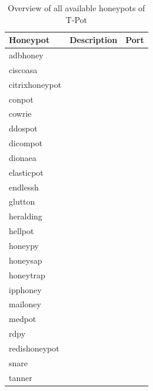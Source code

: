 \begin{table}[h]
    \centering
    \caption{Overview of all available honeypots of T-Pot}
    \begin{tabularx}{\linewidth}{l|l|l}
        \toprule
        \textbf{Honeypot}                                 & \textbf{Description} & \textbf{Port} \\
        \hline
        adbhoney                                 &             &      \\
        ciscoasa \cite{cymmetria2018}            &             &      \\
        citrixhoneypot \cite{citrixhoneypot2020} &             &      \\
        conpot \cite{conpot2021}                 &             &      \\
        cowrie \cite{cowire2021}                 &             &      \\
        ddospot \cite{ddosspot2021}              &             &      \\
        dicompot \cite{dicompot2021}             &             &      \\
        dionaea \cite{dionaea2021}               &             &      \\
        elasticpot \cite{elasticpot2021}         &             &      \\
        endlessh \cite{endlessh2021}             &             &      \\
        glutton \cite{glutton2021}               &             &      \\
        heralding \cite{heralding2021}           &             &      \\
        hellpot \cite{hellpot2021}               &             &      \\
        honeypy \cite{honeysap2021}              &             &      \\
        honeysap \cite{honeysap2021}             &             &      \\
        honeytrap \cite{honeytrap2021}           &             &      \\
        ipphoney \cite{ipphoney2021}             &             &      \\
        mailoney                                 &             &      \\
        medpot \cite{medpot2021}                 &             &      \\
        rdpy \cite{rdpy2021}                     &             &      \\
        redishoneypot                            &             &      \\
        snare \cite{snare2021}                   &             &      \\
        tanner \cite{tanner2021}                 &             &      \\
        \bottomrule
    \end{tabularx}
    \label{tab:overview-honeypots}
\end{table}

